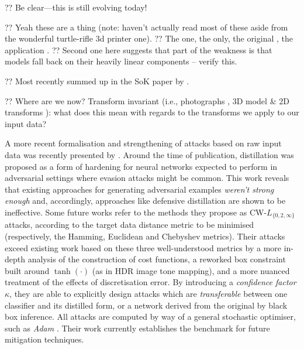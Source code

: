 ?? Be clear---this is still evolving today!

?? Yeah these are a thing (note: haven't actually read most of these aside from the wonderful turtle-rifle 3d printer one).
?? The one, the only, the original \parencite{DBLP:journals/corr/SzegedyZSBEGF13}, the application \parencite{DBLP:journals/corr/GoodfellowSS14}.
?? Second one here suggests that part of the weakness is that models fall back on their heavily linear components -- verify this.

?? Most recently summed up in the SoK paper by \textcite{DBLP:conf/eurosp/PapernotMSW18}.

?? Where are we now? Transform invariant (i.e., photographs \cite{DBLP:journals/corr/KurakinGB16}, 3D model \& 2D transforms \cite{DBLP:journals/corr/AthalyeS17}): what does this mean with regards to the transforms we apply to our input data?

A more recent formalisation and strengthening of attacks based on raw input data was recently presented by \textcite{DBLP:conf/sp/Carlini017}.
Around the time of publication, distillation \cite{DBLP:conf/sp/PapernotM0JS16} was proposed as a form of hardening for neural networks expected to perform in adversarial settings where evasion attacks might be common.
This work reveals that existing approaches for generating adversarial examples \emph{weren't strong enough} and, accordingly, approaches like defensive distillation are shown to be ineffective.
Some future works refer to the methods they propose as CW-$L_{\{0, 2, \infty\}}$ attacks, according to the target data distance metric to be minimised (respectively, the Hamming, Euclidean and Chebyshev metrics).
Their attacks exceed existing work based on these three well-understood metrics by a more in-depth analysis of the construction of cost functions, a reworked box constraint built around $\tanh(\cdot)$ (as in HDR image tone mapping), and a more nuanced treatment of the effects of discretisation error.
By introducing a \emph{confidence factor} $\kappa$, they are able to explicitly design attacks which are \emph{transferable} between one classifier and its distilled form, or a network derived from the original by black box inference.
All attacks are computed by way of a general stochastic optimiser, such as \emph{Adam} \cite{DBLP:journals/corr/KingmaB14}.
Their work currently establishes the benchmark for future mitigation techniques.

